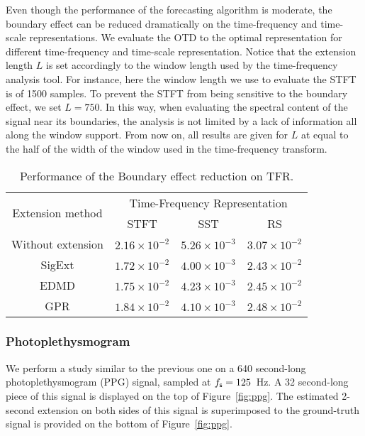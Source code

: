 Even though the performance of the forecasting algorithm is moderate, the boundary effect can be reduced dramatically on the time-frequency and time-scale representations. We evaluate the OTD to the optimal representation for different time-frequency and time-scale representation. Notice that the extension length $L$ is set accordingly to the window length used by the time-frequency analysis tool. For instance, here the window length we use to evaluate the STFT is of 1500 samples. To prevent the STFT from being sensitive to the boundary effect, we set $L=750$. In this way, when evaluating the spectral content of the signal near its boundaries, the analysis is not limited by a lack of information all along the window support. From now on, all results are given for $L$ at equal to the half of the width of the window used in the time-frequency transform.  

\begin{table}
\centering
\caption{Performance of the Boundary effect reduction on TFR.}
\begin{tabular}{|c||c|c|c|}
  \hline
   \multirow{2}{*}{Extension method} & \multicolumn{3}{c|}{Time-Frequency Representation} \\
   \cline{2-4}
      & STFT & SST & RS\\
   \hhline{|=#=|=|=|}
   Without extension & $2.16\times 10^{-2}$ & $5.26\times 10^{-3}$ & $3.07\times 10^{-2}$ \\
   \hline
   {\sf SigExt} & $1.72\times 10^{-2}$ & $4.00\times 10^{-3}$ & $2.43\times 10^{-2}$ \\
   \hline
   EDMD & $1.75\times 10^{-2}$ & $4.23\times 10^{-3}$ & $2.45\times 10^{-2}$ \\
   \hline
   GPR & $1.84\times 10^{-2}$ & $4.10\times 10^{-3}$ & $2.48\times 10^{-2}$ \\
   \hline
\end{tabular}
\label{tab:otd.tho}
\end{table}


\subsubsection{Photoplethysmogram}
\label{ssse:ppg}
We perform a study similar to the previous one on a 640 second-long photoplethysmogram (PPG) signal, sampled at $f_{\mathsf s}=125$~Hz. A 32 second-long piece of this signal is displayed on the top of Figure~\ref{fig:ppg}. The estimated 2-second extension on both sides of this signal is superimposed to the ground-truth signal is provided on the bottom of Figure~\ref{fig:ppg}.


